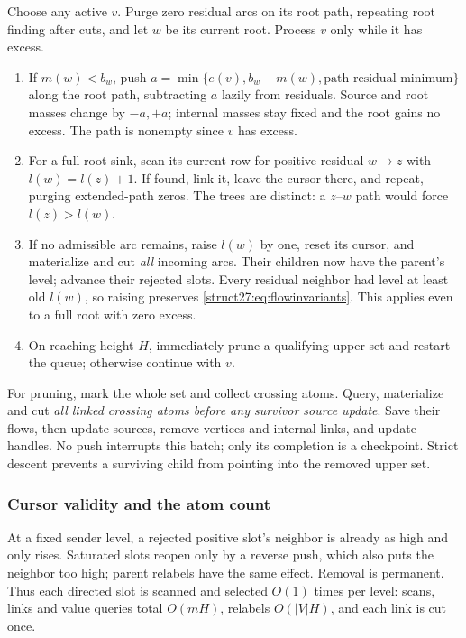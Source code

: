 \documentclass[11pt]{article}
\theoremstyle{remark}
\begin{document}
Choose any active $v$.  Purge zero residual arcs on its root path,
repeating root finding after cuts, and let $w$ be its current root.
Process $v$ only while it has excess.
\begin{enumerate}[leftmargin=*]
\item If $m(w)<b_w$, push
$a=\min\{e(v),b_w-m(w),\text{path residual minimum}\}$
along the root path, subtracting $a$ lazily from residuals.
Source and root masses change by $-a,+a$; internal masses stay fixed
and the root gains no excess.
The path is nonempty since $v$ has excess.
\item For a full root sink, scan its current row for positive residual
$w\to z$ with $l(w)=l(z)+1$.  If found, link it, leave the cursor there, and
repeat, purging extended-path zeros.  The trees are distinct: a
$z$--$w$ path would force $l(z)>l(w)$.
\item If no admissible arc remains, raise $l(w)$ by one, reset its cursor,
and materialize and cut \emph{all} incoming arcs.  Their children now
have the parent's level; advance their rejected slots.
Every residual neighbor had level at least old $l(w)$, so raising
preserves \eqref{struct27:eq:flowinvariants}.  This applies even to a full root
with zero excess.
\item On reaching height $H$, immediately prune a qualifying upper
set and restart the queue; otherwise continue with $v$.
\end{enumerate}

For pruning, mark the whole set and collect crossing atoms.
Query, materialize and cut \emph{all linked crossing atoms before any survivor
source update}.
Save their flows, then update sources, remove vertices and internal links, and
update handles.
No push interrupts this batch; only its completion is a checkpoint.
Strict descent prevents a surviving child from pointing into the removed upper
set.

\subsubsection{Cursor validity and the atom count} At a fixed sender level, a
rejected positive slot's neighbor is already as high and only rises.
Saturated slots reopen only by a reverse push, which also puts the neighbor too
high; parent relabels have the same effect.
Removal is permanent.
Thus each directed slot is scanned and selected $O(1)$ times per level: scans,
links and value queries total $O(mH)$, relabels $O(|V|H)$, and each link is cut
once.
\end{document}
